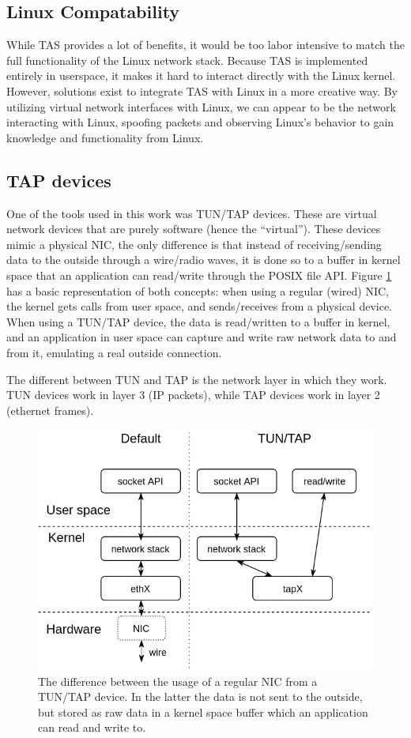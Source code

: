 \subsection{Linux Compatability}

While TAS provides a lot of benefits, it would be too labor intensive to match 
the full functionality of the Linux network stack. Because TAS is implemented
entirely in userspace, it makes it hard to interact directly with the Linux 
kernel. However, solutions exist to integrate TAS with Linux in a more creative
way. By utilizing virtual network interfaces with Linux, we can appear to be the
network interacting with Linux, spoofing packets and observing Linux's behavior 
to gain knowledge and functionality from Linux. 

\subsection{TAP devices}

One of the tools used in this work was TUN/TAP devices. These are virtual network devices that are purely software 
(hence the ``virtual''). These devices mimic a physical NIC, the only difference is that instead of receiving/sending
data to the outside through a wire/radio waves, it is done so to a buffer in kernel space that an application can read/write
through the POSIX file API. Figure \ref{fig:tap} has a basic representation of both concepts: when using a regular (wired)
NIC, the kernel gets calls from user space, and sends/receives from a physical device. When using a TUN/TAP device, the data is
read/written to a buffer in kernel, and an application in user space can capture and write raw network data to and from it, 
emulating a real outside connection.

The different between TUN and TAP is the network layer in which they work. TUN devices work in layer 3 (IP packets), while TAP
devices work in layer 2 (ethernet frames).


\begin{figure}
\centering
\includegraphics[width=0.7\columnwidth]{figures/tap_diag.png}
\caption{The difference between the usage of a regular NIC from a TUN/TAP device. In the latter the data is not sent to the
outside, but stored as raw data in a kernel space buffer which an application can read and write to.}
\label{fig:tap}
\end{figure}
